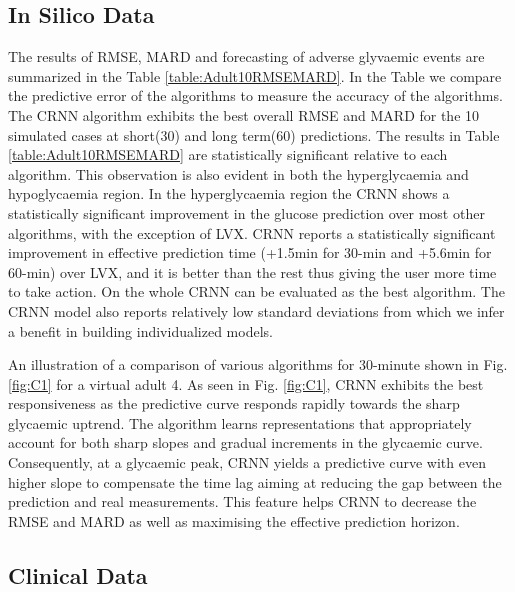 \documentclass[a4paper, 10 pt, twocolumn]{IEEEtran}
\begin{document}
\subsection{In Silico Data}{The results of RMSE, MARD and forecasting of adverse glyvaemic events are summarized in the Table \ref{table:Adult10RMSEMARD}.}
In the Table we compare the predictive error of the algorithms to measure the accuracy of the algorithms. {The CRNN algorithm exhibits the best overall RMSE and MARD for the 10 simulated cases at short(30) and long
term(60) predictions.} The results in Table \ref{table:Adult10RMSEMARD} are statistically significant relative to each algorithm. This observation is also evident in both the hyperglycaemia and hypoglycaemia region.  {In
the hyperglycaemia region the CRNN shows a statistically significant improvement in the glucose prediction
over most other algorithms, with the exception of LVX.} {CRNN reports a statistically significant improvement in effective prediction time (+1.5min for 30-min and +5.6min for 60-min) over LVX, and it is better than the
rest thus giving the user more time to take action.
On the whole CRNN can be evaluated as the best algorithm.}
The CRNN model also reports relatively low standard deviations from which we infer a benefit in building individualized models.

An illustration of a comparison of various algorithms for 30-minute shown in Fig. \ref{fig:C1} for a virtual adult 4.
As seen in Fig. \ref{fig:C1}, CRNN exhibits the best responsiveness as the predictive curve responds rapidly towards the sharp glycaemic uptrend. The algorithm learns representations that appropriately account for both
sharp slopes and gradual increments in the glycaemic curve. Consequently, at a glycaemic peak, CRNN yields a predictive curve with even higher slope to compensate the time lag aiming at reducing the gap between the
prediction and real measurements. This feature helps CRNN to decrease the RMSE and MARD as well as maximising the effective prediction horizon.


\subsection{Clinical Data}
\end{document}
